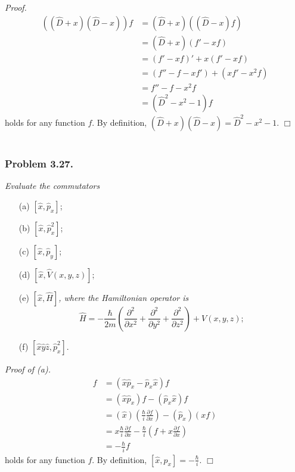 \documentclass{article}
\begin{document}
\emph{Proof.}
\begin{align*}
((\hat{D}+x)(\hat{D}-x))f
&= (\hat{D}+x)((\hat{D}-x)f) \\
&= (\hat{D}+x)(f'-xf) \\
&= (f'-xf)' + x(f'-xf) \\
&= (f''-f-xf') + (xf'-x^2f) \\
&= f''-f-x^2f \\
&= (\hat{D}^2-x^2-1)f
\end{align*}
holds for any function $f$.
By definition,
$(\hat{D}+x)(\hat{D}-x) = \hat{D}^2-x^2-1$.
$\Box$ \\\\






\subsubsection*{Problem 3.27.}
\emph{Evaluate the commutators}
\begin{enumerate}
\item[(a)]
$[\hat{x}, \hat{p}_x]$;
\item[(b)]
$[\hat{x}, \hat{p}_x^2]$;
\item[(c)]
$[\hat{x}, \hat{p}_y]$;
\item[(d)]
$[\hat{x}, \hat{V}(x,y,z)]$;
\item[(e)]
\emph{$[\hat{x}, \hat{H}]$, where the Hamiltonian operator is
$$\hat{H} = -\frac{\hbar}{2m}\left(
\frac{\partial^2}{\partial x^2} + \frac{\partial^2}{\partial y^2} + \frac{\partial^2}{\partial z^2}
\right) + V(x,y,z);$$}
\item[(f)]
$[\hat{x}\hat{y}\hat{z}, \hat{p}_x^2]$. \\
\end{enumerate}

\emph{Proof of (a).}
\begin{align*}
[\hat{x}, \hat{p}_x]f
&= (\hat{x}\hat{p}_x - \hat{p}_x \hat{x})f \\
&= (\hat{x}\hat{p}_x)f - (\hat{p}_x \hat{x})f \\
&= (\hat{x})\left( \frac{\hbar}{i}\frac{\partial f}{\partial x} \right)
  - (\hat{p}_x)(xf) \\
&= x \frac{\hbar}{i}\frac{\partial f}{\partial x}
  - \frac{\hbar}{i}\left( f + x \frac{\partial f}{\partial x} \right) \\
&= - \frac{\hbar}{i} f
\end{align*}
holds for any function $f$.
By definition,
$[\hat{x}, \hat{p}_x] = - \frac{\hbar}{i}$.
$\Box$ \\
\end{document}
